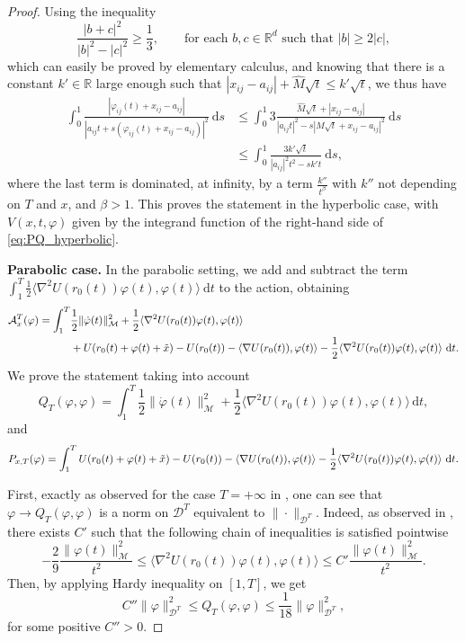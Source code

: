 \documentclass[a4paper,10pt]{amsart}
\newcommand{\numberset}{\mathbb}
\newcommand{\R}{\numberset{R}}
\newcommand{\ud}{\mathrm{d}}
\theoremstyle{plain}
\theoremstyle{definition}
\numberwithin{equation}{section}
\numberwithin{thm}{section}
\begin{document}
\begin{proof}
Using the inequality
\[
    \frac{|b+c|^2}{|b|^2 - |c|^2} \geq \frac{1}{3}, \qquad \text{for each }b,c\in\mathbb{R}^d \text{ such that }|b|\geq2|c|,
\]
which can easily be proved by elementary calculus, and knowing that there is a constant $k'\in\R$ large enough such that $|x_{ij} - a_{ij}|+\hat M\sqrt{t} \leq k'\sqrt{t}$, we thus have
\[
\begin{split}
   \int_{0}^{1} \frac{|\varphi_{ij}(t)+x_{ij}-a_{ij}|}{|a_{ij}t + s(\varphi_{ij}(t)+x_{ij} -a_{ij}) |^2}\ \ud s 
    & \leq \int_{0}^{1} 3\frac{\hat M\sqrt{t}+|x_{ij}-a_{ij}|}{|a_{ij}t|^2 - s|M\sqrt{t}+x_{ij} - a_{ij}|^2}\ \ud s \\
    & \leq \int_{0}^{1} \frac{3k'\sqrt{t}}{|a_{ij}|^2 t^2 - sk't}\ \ud s,
\end{split}
\]
where the last term is dominated, at infinity, by a term $\frac{k''}{t^\beta}$ with $k''$ not depending on $T$ and $x$, and $\beta>1$. This proves the statement in the hyperbolic case, with $V(x,t,\varphi)$ given by the integrand function of the right-hand side of \eqref{eq:PQ_hyperbolic}.

\smallskip
\textbf{Parabolic case.} In the parabolic setting, we add and subtract the term $\int_{1}^{T} \frac{1}{2}\langle \nabla^2 U(r_0(t))\varphi(t),\varphi(t)\rangle\ \ud t$ to the action, obtaining
\[
    \begin{split}
   \mathcal{A}_{x}^T(\varphi) = \int_{1}^{T} &\frac{1}{2}\|\dot{\varphi}(t)\|_\mathcal{M}^2 + \frac{1}{2}\langle \nabla^2 U(r_0(t))\varphi(t),\varphi(t)\rangle\\
    &+ U(r_0(t)+\varphi(t)+\Tilde{x}) - U(r_0(t)) - \langle \nabla U(r_0(t)),\varphi(t)\rangle - \frac{1}{2}\langle \nabla^2 U(r_0(t))\varphi(t),\varphi(t)\rangle\ \ud t.
    \end{split}
\]
We prove the statement taking into account
\[
Q_T(\varphi,\varphi) = \int_1^T \frac{1}{2}\|\dot \varphi(t)\|_\mathcal{M}^2+\frac{1}{2}\langle\nabla^2 U(r_0(t))\varphi(t),\varphi(t)\rangle \, \ud t,
\]
and
\[
P_{x,T}(\varphi) = \int_1^T  U(r_0(t)+\varphi(t)+ \Tilde{x}) - U(r_0(t)) - \langle \nabla U(r_0(t)),\varphi(t)\rangle - \frac{1}{2}\langle \nabla^2 U(r_0(t))\varphi(t),\varphi(t)\rangle\ \ud t.
\]

First, exactly as observed for the case $T=+\infty$ in \cite[Section 4.2]{PolimeniTerracini}, one can see that $\varphi \to Q_T(\varphi,\varphi)$ is a norm on $\mathcal{D}^T$ equivalent to $\|\cdot\|_{\mathcal{D}^T}$. Indeed, as observed in \cite[Section 4.2]{PolimeniTerracini}, there exists $C'$ such that the following chain of inequalities is satisfied pointwise 
\[
-\frac{2}{9}\frac{\|\varphi(t)\|_\mathcal{M}^2}{t^2} \le \langle \nabla^2 U(r_0(t))\varphi(t), \varphi(t)\rangle \le C' \frac{\|\varphi(t)\|_\mathcal{M}^2}{t^2}.
\]
Then, by applying Hardy inequality on $[1,T]$, we get
\[
C''\|\varphi\|_{\mathcal{D}^T}^2 \le Q_T(\varphi, \varphi) \le \frac{1}{18}\|\varphi\|^2_{\mathcal{D}^T},
\]
for some positive $C''>0$.


\end{proof}
\end{document}
